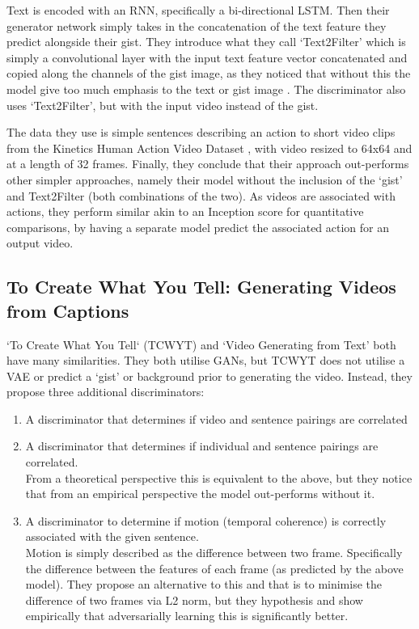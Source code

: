 \documentclass{article}
\begin{document}
Text is encoded with an RNN, specifically a bi-directional LSTM. Then their generator network simply takes in the concatenation of the text feature they predict alongside their gist. They introduce what they call `Text2Filter' which is simply a convolutional layer with the input text feature vector concatenated and copied along the channels of the gist image, as they noticed that without this the model give too much emphasis to the text or gist image \cite{li_video_2017}. The discriminator also
uses `Text2Filter', but with the input video instead of the gist.

The data they use is simple sentences describing an action to short video clips from the Kinetics Human Action Video Dataset \cite{kay_kinetics_2017}, with video resized to 64x64 and at a length of 32 frames. Finally, they conclude that their approach out-performs other simpler approaches, namely their model without the inclusion of the `gist' and Text2Filter (both combinations of the two). As videos are associated with actions, they perform similar akin to an Inception score for quantitative
comparisons, by having a separate model predict the associated action for an output video.

\subsection{To Create What You Tell: Generating Videos from Captions}

`To Create What You Tell` (TCWYT) \cite{pan_create_2018} and `Video Generating from Text' \cite{li_video_2017} both have many similarities. They both utilise GANs, but TCWYT does not utilise
a VAE or predict a `gist' or background prior to generating the video. Instead, they propose three additional discriminators:

\begin{enumerate}
    \item A discriminator that determines if video and sentence pairings are correlated
    \item A discriminator that determines if individual and sentence pairings are correlated.\\
        From a theoretical perspective this is equivalent to the above, but they notice that from an empirical perspective 
        the model out-performs without it.
    \item A discriminator to determine if motion (temporal coherence) is correctly associated with the given sentence.\\
        Motion is simply described as the difference between two frame. Specifically the difference between the features of each frame (as predicted by the above model). They propose
        an alternative to this and that is to minimise the difference of two frames via L2 norm, but they hypothesis and show empirically that adversarially learning this is significantly better.
\end{enumerate}
\end{document}
